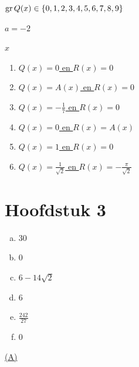 \documentclass{ximera}
\begin{document}
\begin{Antwoord} \label{antw2.17}
\hyperlink{oef2.17}{$\operatorname{gr} Q(x) \in \left\{0,1,2,3,4,5,6,7,8,9\right\}$}
\end{Antwoord}

\begin{Antwoord} \label{antw2.18}
\hyperlink{oef2.18}{$a=-2$}
\end{Antwoord}

\begin{Antwoord} \label{antw2.19}
\hyperlink{oef2.19}{$x$}
\end{Antwoord}

\begin{Antwoord} \label{antw2.20}
\begin{enumerate}
\item
\hyperlink{oef2.20}{$Q(x) = 0$ en $R(x) = 0$}
\item
\hyperlink{oef2.20}{$Q(x) = A(x)$ en $R(x) = 0$}
\item
\hyperlink{oef2.20}{$Q(x) = -\frac{1}{7}$ en $R(x) = 0$}
\item
\hyperlink{oef2.20}{$Q(x) = 0$ en $R(x) = A(x)$}
\item
\hyperlink{oef2.20}{$Q(x) = 1$ en $R(x) = 0$}
\item
\hyperlink{oef2.20}{$Q(x) = \frac{1}{\sqrt{2}}$ en $R(x) =-\frac{\pi}{\sqrt{2}}$}
\end{enumerate}
\setcounter{enumi}{0}
\end{Antwoord}

\section*{Hoofdstuk 3}

\begin{Antwoord} \label{antw3.1}
\begin{enumerate}[(a)]
\item
\hyperlink{oef3.1}{$30$}
\item
\hyperlink{oef3.1}{$0$}
\item
\hyperlink{oef3.1}{$6-14\sqrt{2}$}
\item
\hyperlink{oef3.1}{$6$}
\item
\hyperlink{oef3.1}{$\frac{242}{27}$}
\item
\hyperlink{oef3.1}{$0$}
\end{enumerate}
\end{Antwoord}

\begin{Antwoord} \label{antw3.2}
\hyperlink{oef3.2}{(A)}
\end{Antwoord}
\end{document}
